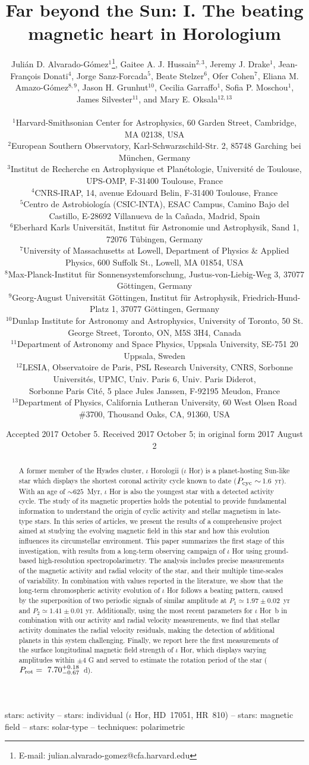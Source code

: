 \documentclass[a4paper,fleqn,usenatbib]{mnras}
\title[The beating magnetic heart in Horologium]{Far beyond the Sun: I. The beating magnetic heart in Horologium}
\author[J. D. Alvarado-G\'omez et al.]{Juli\'an D. Alvarado-G\'omez$^{1}$\thanks{E-mail: julian.alvarado-gomez@cfa.harvard.edu},
Gaitee A. J. Hussain$^{2,3}$,
Jeremy J. Drake$^{1}$,
\newauthor
Jean-Fran\c{c}ois Donati$^{4}$,
Jorge Sanz-Forcada$^{5}$,
Beate Stelzer$^{6}$,
Ofer Cohen$^{7}$,
\newauthor
Eliana M. Amazo-G\'omez$^{8,9}$,
Jason H. Grunhut$^{10}$,
Cecilia Garraffo$^{1}$,
\newauthor
Sofia P. Moschou$^{1}$,
James Silvester$^{11}$, and
Mary E. Oksala$^{12,13}$
\\
\\%
$^{1}$Harvard-Smithsonian Center for Astrophysics, 60 Garden Street, Cambridge, MA 02138, USA\\
$^{2}$European Southern Observatory, Karl-Schwarzschild-Str. 2, 85748 Garching bei M\"unchen, Germany\\
$^{3}$Institut de Recherche en Astrophysique et Plan\'etologie, Universit\'e de Toulouse, UPS-OMP, F-31400 Toulouse, France\\
$^{4}$CNRS-IRAP, 14, avenue Edouard Belin, F-31400 Toulouse, France\\
$^{5}$Centro de Astrobiolog\'ia (CSIC-INTA), ESAC Campus, Camino Bajo del Castillo, E-28692 Villanueva de la Ca{\~n}ada, Madrid, Spain\\
$^{6}$Eberhard Karls Universit\"{a}t, Institut f\"{u}r Astronomie und Astrophysik, Sand 1, 72076 T\"{u}bingen, Germany\\
$^{7}$University of Massachusetts at Lowell, Department of Physics \& Applied Physics, 600 Suffolk St., Lowell, MA 01854, USA\\
$^{8}$Max-Planck-Institut f\"{u}r Sonnensystemforschung, Justus-von-Liebig-Weg 3, 37077 G\"{o}ttingen, Germany\\
$^{9}$Georg-August Universit\"{a}t G\"{o}ttingen, Institut f\"{u}r Astrophysik, Friedrich-Hund-Platz 1, 37077 G\"{o}ttingen, Germany\\
$^{10}$Dunlap Institute for Astronomy and Astrophysics, University of Toronto, 50 St. George Street, Toronto, ON, M5S 3H4, Canada\\
$^{11}$Department of Astronomy and Space Physics, Uppsala University, SE-751 20 Uppsala, Sweden\\
$^{12}$LESIA, Observatoire de Paris, PSL Research University, CNRS, Sorbonne Universit\'es, UPMC, Univ. Paris 6, Univ. Paris Diderot,
\\\hspace{0.34cm}Sorbonne Paris Cit\'e, 5 place Jules Janssen, F-92195 Meudon, France\\
$^{13}$Department of Physics, California Lutheran University, 60 West Olsen Road \#3700, Thousand Oaks, CA, 91360, USA
}
\date{Accepted 2017 October 5. Received 2017 October 5; in original form 2017 August 2}
\begin{document}
\label{firstpage}
\pagerange{\pageref{firstpage}--\pageref{lastpage}}
\maketitle

\begin{abstract}
A former member of the Hyades cluster, $\iota$ Horologii ($\iota$ Hor) is a planet-hosting Sun-like star which displays the shortest coronal activity cycle known to date ($P_{\rm cyc}\sim$\,1.6~yr). With an age of $\sim$$625$~Myr, $\iota$ Hor is also the youngest star with a detected activity cycle. The study of its magnetic properties holds the potential to provide fundamental information to understand the origin of cyclic activity and stellar magnetism in late-type stars. In this series of articles, we present the results of a comprehensive project aimed at studying the evolving magnetic field in this star and how this evolution influences its circumstellar environment. This paper summarizes the first stage of this investigation, with results from a long-term observing campaign of $\iota$ Hor using ground-based high-resolution spectropolarimetry. The analysis includes precise measurements of the magnetic activity and radial velocity of the star, and their multiple time-scales of variability. In combination with values reported in the literature, we show that the long-term chromospheric activity evolution of $\iota$ Hor follows a beating pattern, caused by the superposition of two periodic signals of similar amplitude at $P_{1} \simeq 1.97 \pm 0.02$~yr and $P_{2} \simeq 1.41 \pm 0.01$ yr. Additionally, using the most recent parameters for $\iota$ Hor~b in combination with our activity and radial velocity measurements, we find that stellar activity dominates the radial velocity residuals, making the detection of additional planets in this system challenging. Finally, we report here the first measurements of the surface longitudinal magnetic field strength of $\iota$ Hor, which displays varying amplitudes within $\pm4$ G and served to estimate the rotation period of the star ($P_{\rm rot} =~7.70^{+0.18}_{-0.67}$~d).

\end{abstract}

\begin{keywords}
stars: activity -- stars: individual ($\iota$ Hor, HD~17051, HR~810) -- stars: magnetic field -- stars: solar-type -- techniques: polarimetric
\end{keywords}
\end{document}
